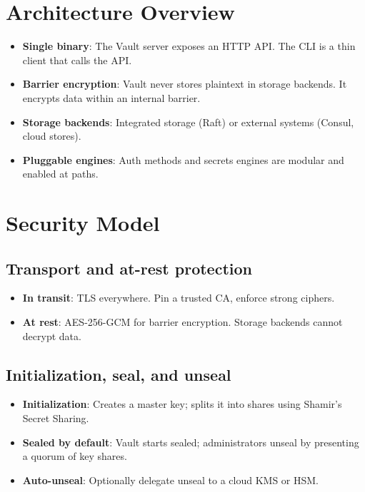 \documentclass[11pt]{article}
\begin{document}
\section{Architecture Overview}

\begin{itemize}
  \item \textbf{Single binary}: The Vault server exposes an HTTP API. The CLI is a thin client that calls the API.
  \item \textbf{Barrier encryption}: Vault never stores plaintext in storage backends. It encrypts data within an internal barrier.
  \item \textbf{Storage backends}: Integrated storage (Raft) or external systems (Consul, cloud stores).
  \item \textbf{Pluggable engines}: Auth methods and secrets engines are modular and enabled at paths.
\end{itemize}

\section{Security Model}

\subsection{Transport and at-rest protection}

\begin{itemize}
  \item \textbf{In transit}: TLS everywhere. Pin a trusted CA, enforce strong ciphers.
  \item \textbf{At rest}: AES-256-GCM for barrier encryption. Storage backends cannot decrypt data.
\end{itemize}

\subsection{Initialization, seal, and unseal}

\begin{itemize}
  \item \textbf{Initialization}: Creates a master key; splits it into shares using Shamir's Secret Sharing.
  \item \textbf{Sealed by default}: Vault starts sealed; administrators unseal by presenting a quorum of key shares.
  \item \textbf{Auto-unseal}: Optionally delegate unseal to a cloud KMS or HSM.
\end{itemize}
\end{document}
